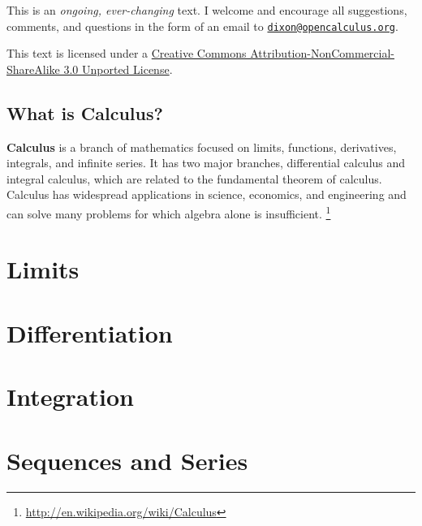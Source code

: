 \documentclass[oneside]{article}
\begin{document}
This is an \textit{ongoing, ever-changing} text. I welcome and encourage all suggestions, comments, and questions in the form of an email to \texttt{\href{mailto:dixon@opencalculus.org}{dixon@opencalculus.org}}. 

This text is licensed under a \href{http://creativecommons.org/licenses/by-nc-sa/3.0/deed.en_US}{Creative Commons Attribution-NonCommercial-ShareAlike 3.0 Unported License}.

\subsection{What is Calculus?}
\textbf{Calculus} is a branch of mathematics focused on limits, functions, derivatives, integrals, and infinite series. It has two major branches, differential calculus and integral calculus, which are related to the fundamental theorem of calculus. Calculus has widespread applications in science, economics, and engineering and can solve many problems for which algebra alone is insufficient. \footnote{\url{http://en.wikipedia.org/wiki/Calculus}}

\section{Limits}

\section{Differentiation}

\section{Integration}

\section{Sequences and Series}
\end{document}
